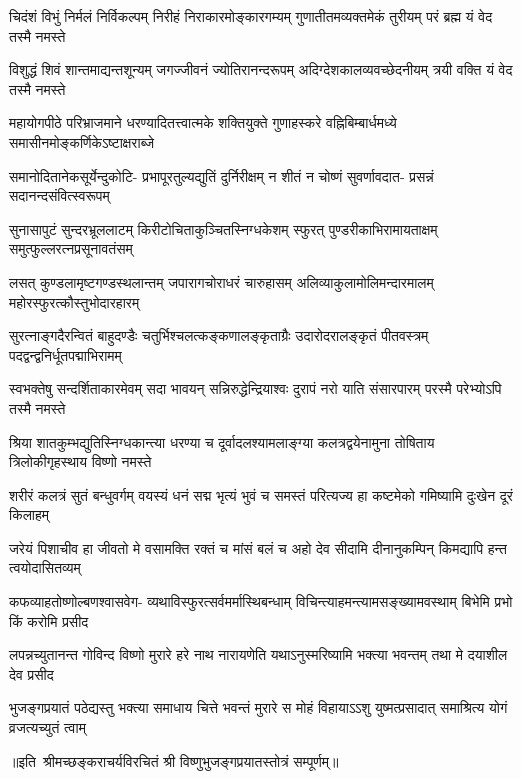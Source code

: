 
\fourlineindentedshloka
{चिदंशं विभुं निर्मलं निर्विकल्पम्‌}
{निरीहं निराकारमोङ्कारगम्यम्‌}
{गुणातीतमव्यक्तमेकं तुरीयम्‌}
{परं ब्रह्म यं वेद तस्मै नमस्ते}%

\fourlineindentedshloka
{विशुद्धं शिवं शान्तमाद्यन्तशून्यम्‌}
{जगज्जीवनं ज्योतिरानन्दरूपम्‌}
{अदिग्देशकालव्यवच्छेदनीयम्‌} 
{त्रयी वक्ति यं वेद तस्मै नमस्ते}%

\fourlineindentedshloka
{महायोगपीठे परिभ्राजमाने} 
{धरण्यादितत्त्वात्मके शक्तियुक्ते}
{गुणाहस्करे वह्निबिम्बार्धमध्ये} 
{समासीनमोङ्कर्णिकेऽष्टाक्षराब्जे}%

\fourlineindentedshloka
{समानोदितानेकसूर्येन्दुकोटि-}
{प्रभापूरतुल्यद्युतिं दुर्निरीक्षम्‌}
{न शीतं न चोष्णं सुवर्णावदात-}
{प्रसन्नं सदानन्दसंवित्स्वरूपम्‌}%

\fourlineindentedshloka
{सुनासापुटं सुन्दरभ्रूललाटम्‌}
{किरीटोचिताकुञ्चितस्निग्धकेशम्‌}
{स्फुरत् पुण्डरीकाभिरामायताक्षम्‌}
{समुत्फुल्लरत्नप्रसूनावतंसम्‌}%

\fourlineindentedshloka
{लसत् कुण्डलामृष्टगण्डस्थलान्तम्‌}
{जपारागचोराधरं चारुहासम्‌}
{अलिव्याकुलामोलिमन्दारमालम्‌}
{महोरस्फुरत्कौस्तुभोदारहारम्‌}%

\fourlineindentedshloka
{सुरत्नाङ्गदैरन्वितं बाहुदण्डैः}
{चतुर्भिश्चलत्कङ्कणालङ्कृताग्रैः}
{उदारोदरालङ्कृतं पीतवस्त्रम्‌}
{पदद्वन्द्वनिर्धूतपद्माभिरामम्‌}%

\fourlineindentedshloka
{स्वभक्तेषु सन्दर्शिताकारमेवम्‌}
{सदा भावयन् सन्निरुद्धेन्द्रियाश्वः}
{दुरापं नरो याति संसारपारम्‌}
{परस्मै परेभ्योऽपि तस्मै नमस्ते}%

\fourlineindentedshloka
{श्रिया शातकुम्भद्युतिस्निग्धकान्त्या}
{धरण्या च दूर्वादलश्यामलाङ्ग्या}
{कलत्रद्वयेनामुना तोषिताय} 
{त्रिलोकीगृहस्थाय विष्णो नमस्ते}%

\fourlineindentedshloka
{शरीरं कलत्रं सुतं बन्धुवर्गम्‌}
{वयस्यं धनं सद्म भृत्यं भुवं च}
{समस्तं परित्यज्य हा कष्टमेको} 
{गमिष्यामि दुःखेन दूरं किलाहम्‌}%

\fourlineindentedshloka
{जरेयं पिशाचीव हा जीवतो मे}
{वसामक्ति रक्तं च मांसं बलं च}
{अहो देव सीदामि दीनानुकम्पिन्}
{किमद्यापि हन्त त्वयोदासितव्यम्‌}%

\fourlineindentedshloka
{कफव्याहतोष्णोल्बणश्वासवेग-}
{व्यथाविस्फुरत्सर्वमर्मास्थिबन्धाम्‌}
{विचिन्त्याहमन्त्यामसङ्ख्यामवस्थाम्}
{बिभेमि प्रभो किं करोमि प्रसीद}%

\fourlineindentedshloka
{लपन्नच्युतानन्त गोविन्द विष्णो}
{मुरारे हरे नाथ नारायणेति}
{यथाऽनुस्मरिष्यामि भक्त्या भवन्तम्‌}
{तथा मे दयाशील देव प्रसीद}%

\fourlineindentedshloka
{भुजङ्गप्रयातं पठेद्यस्तु भक्त्या}
{समाधाय चित्ते भवन्तं मुरारे}
{स मोहं विहायाऽऽशु युष्मत्प्रसादात्}
{समाश्रित्य योगं व्रजत्यच्युतं त्वाम्‌}%

॥इति~श्रीमच्छङ्कराचर्यविरचितं श्री विष्णुभुजङ्गप्रयातस्तोत्रं सम्पूर्णम्‌॥ 

